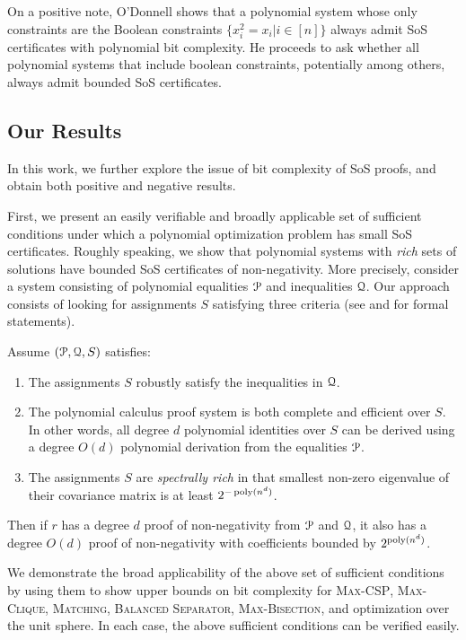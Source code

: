 On a positive note, O'Donnell shows that a polynomial system whose only constraints are the Boolean constraints $\{x_i^2 = x_i | i \in [n]\}$ always admit SoS certificates with polynomial bit complexity.  
%
He proceeds to ask whether all polynomial systems that include boolean constraints, potentially among others, always admit bounded SoS certificates.


\subsection{Our Results}

In this work, we further explore the issue of bit complexity of SoS proofs, and obtain both positive and negative results.
%

First, we present an easily verifiable and broadly applicable set of sufficient conditions under which a polynomial optimization problem has small SoS certificates.
%
Roughly speaking, we show that polynomial systems with {\it rich} sets of solutions have bounded SoS certificates of non-negativity.
%
More precisely, consider a system consisting of polynomial equalities $\mathcal P$ and inequalities $\mathcal Q$.  Our approach consists of looking for assignments $S$ satisfying three criteria (see  and  for formal statements).  
\begin{theorem}
Assume $(\mathcal P, \mathcal Q, S)$ satisfies:
\begin{enumerate}
\item The assignments $S$ robustly satisfy the inequalities in $\mathcal Q$.  
\item The polynomial calculus proof system is both complete and efficient over $S$.  In other words, all degree $d$ polynomial identities over $S$ can be derived using a degree $O(d)$ polynomial derivation from the equalities $\mathcal P$.
\item The assignments $S$ are {\it spectrally rich} in that smallest non-zero eigenvalue of their covariance matrix is at least $2^{-\operatorname{poly}(n^d)}$. 
\end{enumerate}
Then if $r$ has a degree $d$ proof of non-negativity from $\mathcal P$ and $\mathcal Q$, it also has a degree $O(d)$ proof of non-negativity with coefficients bounded by $2^{\operatorname{poly}(n^d)}$.
\end{theorem}

We demonstrate the broad applicability of the above set of sufficient conditions by using them to show upper bounds on bit complexity for \textsc{Max-CSP}, \textsc{Max-Clique}, \textsc{Matching}, \textsc{Balanced Separator}, \textsc{Max-Bisection}, and optimization over the unit sphere.  In each case, the above sufficient conditions can be verified easily. 
%


